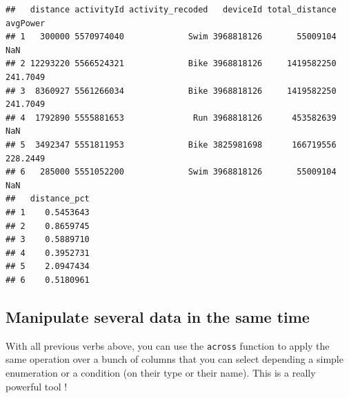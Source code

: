 \documentclass[
]{book}
\newenvironment{Shaded}{\begin{snugshade}}{\end{snugshade}}
\newcommand{\DataTypeTok}[1]{\textcolor[rgb]{0.13,0.29,0.53}{#1}}
\newcommand{\DecValTok}[1]{\textcolor[rgb]{0.00,0.00,0.81}{#1}}
\newcommand{\KeywordTok}[1]{\textcolor[rgb]{0.13,0.29,0.53}{\textbf{#1}}}
\newcommand{\NormalTok}[1]{#1}
\newcommand{\OperatorTok}[1]{\textcolor[rgb]{0.81,0.36,0.00}{\textbf{#1}}}
\newcommand{\StringTok}[1]{\textcolor[rgb]{0.31,0.60,0.02}{#1}}
\begin{document}
\begin{Shaded}
\end{Shaded}

\begin{verbatim}
##   distance activityId activity_recoded   deviceId total_distance avgPower
## 1   300000 5570974040             Swim 3968818126       55009104      NaN
## 2 12293220 5566524321             Bike 3968818126     1419582250 241.7049
## 3  8360927 5561266034             Bike 3968818126     1419582250 241.7049
## 4  1792890 5555881653              Run 3968818126      453582639      NaN
## 5  3492347 5551811953             Bike 3825981698      166719556 228.2449
## 6   285000 5551052200             Swim 3968818126       55009104      NaN
##   distance_pct
## 1    0.5453643
## 2    0.8659745
## 3    0.5889710
## 4    0.3952731
## 5    2.0947434
## 6    0.5180961
\end{verbatim}

\hypertarget{manipulate-several-data-in-the-same-time}{%
\subsection{Manipulate several data in the same time}\label{manipulate-several-data-in-the-same-time}}

With all previous verbs above, you can use the \texttt{across} function to apply the same operation over a bunch of columns that you can select depending a simple enumeration or a condition (on their type or their name). This is a really powerful tool !
\end{document}
